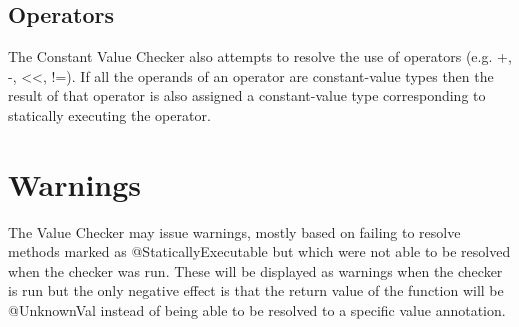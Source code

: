 \subsection{Operators}
The Constant Value Checker also attempts to resolve the use of
operators (e.g. +, -, <<, !=). If all the operands of an operator are
constant-value types then the result of that operator is also
assigned a constant-value type corresponding to statically executing
the operator. 

\section{Warnings}
The Value Checker may issue warnings, mostly based on failing to
resolve methods marked as @StaticallyExecutable but which were not able to be
resolved when the checker was run. These will be displayed as warnings when
the checker is run but the only negative effect is that the return
value of the function will be @UnknownVal instead of being able to be
resolved to a specific value annotation.


